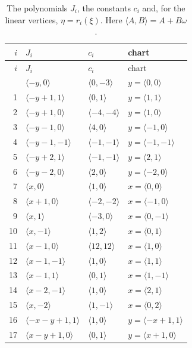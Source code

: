 \documentclass[11pt]{article}
\begin{document}
\begingroup\small
\setlength{\LTcapwidth}{\textwidth}
\begin{longtable}{@{}rlll@{}}
\caption{The polynomials $J_i$, the constants $c_i$ and, for the linear vertices, $\eta=r_i(\xi)$. Here $\langle A,B\rangle=A+B\omega$.}\label{tab:cvert1}\\
\hline $i$ & $J_i$ & $c_i$ & chart\\\hline\endfirsthead\hline $i$ & $J_i$ & $c_i$ & chart\\\hline\endhead\hline\endfoot
0 & $\langle -y,0\rangle$ & $\langle 0,-3\rangle$ & $y=\langle 0,0\rangle$\\
1 & $\langle -y+1,1\rangle$ & $\langle 0,1\rangle$ & $y=\langle 1,1\rangle$\\
2 & $\langle -y+1,0\rangle$ & $\langle -4,-4\rangle$ & $y=\langle 1,0\rangle$\\
3 & $\langle -y-1,0\rangle$ & $\langle 4,0\rangle$ & $y=\langle -1,0\rangle$\\
4 & $\langle -y-1,-1\rangle$ & $\langle -1,-1\rangle$ & $y=\langle -1,-1\rangle$\\
5 & $\langle -y+2,1\rangle$ & $\langle -1,-1\rangle$ & $y=\langle 2,1\rangle$\\
6 & $\langle -y-2,0\rangle$ & $\langle 2,0\rangle$ & $y=\langle -2,0\rangle$\\
7 & $\langle x,0\rangle$ & $\langle 1,0\rangle$ & $x=\langle 0,0\rangle$\\
8 & $\langle x+1,0\rangle$ & $\langle -2,-2\rangle$ & $x=\langle -1,0\rangle$\\
9 & $\langle x,1\rangle$ & $\langle -3,0\rangle$ & $x=\langle 0,-1\rangle$\\
10 & $\langle x,-1\rangle$ & $\langle 1,2\rangle$ & $x=\langle 0,1\rangle$\\
11 & $\langle x-1,0\rangle$ & $\langle 12,12\rangle$ & $x=\langle 1,0\rangle$\\
12 & $\langle x-1,-1\rangle$ & $\langle 1,0\rangle$ & $x=\langle 1,1\rangle$\\
13 & $\langle x-1,1\rangle$ & $\langle 0,1\rangle$ & $x=\langle 1,-1\rangle$\\
14 & $\langle x-2,-1\rangle$ & $\langle 1,0\rangle$ & $x=\langle 2,1\rangle$\\
15 & $\langle x,-2\rangle$ & $\langle 1,-1\rangle$ & $x=\langle 0,2\rangle$\\
16 & $\langle -x-y+1,1\rangle$ & $\langle 1,0\rangle$ & $y=\langle -x+1,1\rangle$\\
17 & $\langle x-y+1,0\rangle$ & $\langle 0,1\rangle$ & $y=\langle x+1,0\rangle$\\

\end{longtable}
\end{document}
